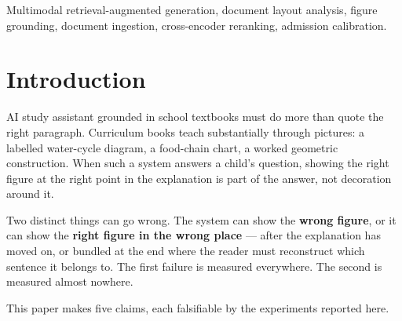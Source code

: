 \documentclass[journal]{IEEEtran}
\begin{document}
\begin{abstract}
Two findings require no model and replicate across both extraction pipelines. Only
19.3\,\%/34.3\,\% of figures carry a printed caption, while \textbf{100\,\%} carry
a recoverable reading-order anchor. And under perfect retrieval \emph{and} a
perfect answer, caption-based placement is still off by 2.08/4.69 sentences.
Placement is not implied by retrieval. Notably, the corpus with nearly twice the
caption coverage places \emph{worse}, because its share of lexically
indistinguishable figures also doubles: caption availability is not caption
discriminability.

On the textbook corpus, composing a vision-language filter with that same
cross-encoder raises figure-selection precision from 0.028 to 0.542 against a
preliminary human annotation ($n=48$) --- sight for recall, discrimination for
precision --- a result the MMDocRAG gate run now corroborates externally.

\end{abstract}

\begin{IEEEkeywords}
Multimodal retrieval-augmented generation, document layout analysis, figure
grounding, document ingestion, cross-encoder reranking, admission calibration.
\end{IEEEkeywords}

\section{Introduction}

 AI study assistant grounded in school textbooks must do more
than quote the right paragraph. Curriculum books teach substantially through
pictures: a labelled water-cycle diagram, a food-chain chart, a worked geometric
construction. When such a system answers a child's question, showing the right
figure at the right point in the explanation is part of the answer, not decoration
around it.

Two distinct things can go wrong. The system can show the \textbf{wrong figure}, or
it can show the \textbf{right figure in the wrong place} --- after the explanation
has moved on, or bundled at the end where the reader must reconstruct which
sentence it belongs to. The first failure is measured everywhere. The second is
measured almost nowhere.

This paper makes five claims, each falsifiable by the experiments reported here.
\end{document}
